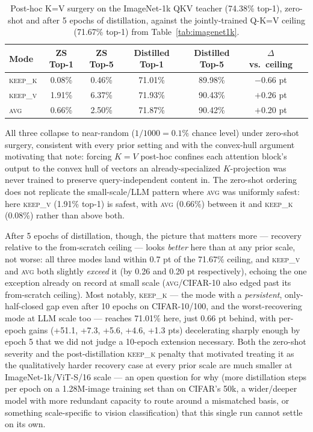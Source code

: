 \documentclass[11pt]{article}
\begin{document}
\begin{table}[h]
\centering
\caption{Post-hoc K=V surgery on the ImageNet-1k QKV teacher (74.38\% top-1),
zero-shot and after 5 epochs of distillation, against the jointly-trained
Q-K=V ceiling (71.67\% top-1) from Table~\ref{tab:imagenet1k}.}
\label{tab:surgery}
\begin{tabular}{@{}lcccccc@{}}
\toprule
Mode & ZS Top-1 & ZS Top-5 & Distilled Top-1 & Distilled Top-5 & $\Delta$ vs.\ ceiling \\
\midrule
\textsc{keep\_k} & 0.08\% & 0.46\% & 71.01\% & 89.98\% & $-$0.66 pt \\
\textsc{keep\_v} & 1.91\% & 6.37\% & 71.93\% & 90.43\% & $+$0.26 pt \\
\textsc{avg}     & 0.66\% & 2.50\% & 71.87\% & 90.42\% & $+$0.20 pt \\
\bottomrule
\end{tabular}
\end{table}

All three collapse to near-random ($1/1000 = 0.1\%$ chance level) under
zero-shot surgery, consistent with every prior setting and with the
convex-hull argument motivating that note: forcing $K=V$ post-hoc confines
each attention block's output to the convex hull of vectors an
already-specialized $K$-projection was never trained to preserve query-independent
content in. The zero-shot ordering does not replicate the small-scale/LLM
pattern where \textsc{avg} was uniformly safest: here \textsc{keep\_v}
(1.91\% top-1) is safest, with \textsc{avg} (0.66\%) between it and
\textsc{keep\_k} (0.08\%) rather than above both.

After 5 epochs of distillation, though, the picture that matters more ---
recovery relative to the from-scratch ceiling --- looks \emph{better} here
than at any prior scale, not worse: all three modes land within 0.7 pt of
the 71.67\% ceiling, and \textsc{keep\_v} and \textsc{avg} both slightly
\emph{exceed} it (by 0.26 and 0.20 pt respectively), echoing the one
exception already on record at small scale (\textsc{avg}/CIFAR-10 also
edged past its from-scratch ceiling). Most notably, \textsc{keep\_k} ---
the mode with a \emph{persistent}, only-half-closed gap even after 10
epochs on CIFAR-10/100, and the worst-recovering mode at LLM scale too ---
reaches 71.01\% here, just 0.66 pt behind, with per-epoch gains
(+51.1, +7.3, +5.6, +4.6, +1.3 pts) decelerating sharply enough by epoch 5
that we did not judge a 10-epoch extension necessary. Both the zero-shot
severity and the post-distillation \textsc{keep\_k} penalty that motivated
treating it as the qualitatively harder recovery case at every prior scale
are much smaller at ImageNet-1k/ViT-S/16 scale --- an open question for why
(more distillation steps per epoch on a 1.28M-image training set than on
CIFAR's 50k, a wider/deeper model with more redundant capacity to route
around a mismatched basis, or something scale-specific to vision
classification) that this single run cannot settle on its own.
\end{document}
